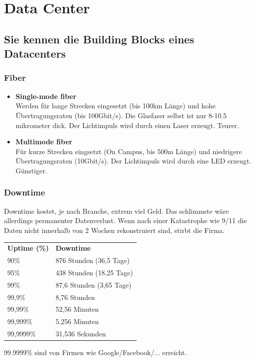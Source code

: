 \chapter{Data Center}
\section{Sie kennen die Building Blocks eines Datacenters}
\subsection{Fiber}
\begin{itemize}
	\item \textbf{Single-mode fiber}\\
		Werden für lange Strecken eingesetzt (bis 100km Länge) und hohe Übertragungsraten (bis 100Gbit/s). Die Glasfaser selbst ist nur 8-10.5 mikrometer dick. Der Lichtimpuls wird durch einen Laser erzeugt. Teurer.
	\item \textbf{Multimode fiber}\\
	Für kurze Strecken eingsetzt (On Campus, bis 500m Länge) und niedrigere Übertragungsraten (10Gbit/s). Der Lichtimpuls wird durch eine LED erzeugt. Günstiger.
\end{itemize}
\subsection{Downtime}
Downtime kostet, je nach Branche, extrem viel Geld. Das schlimmste wäre allerdings permanenter Datenverlust. Wenn nach einer Katastrophe wie 9/11 die Daten nicht innerhalb von 2 Wochen rekonstruiert sind, stirbt die Firma.
\begin{table}[h]
	\begin{tabular}{ll}
		\textbf{Uptime (\%)} & \textbf{Downtime}        \\
		90\%                 & 876 Stunden (36,5 Tage)  \\
		95\%                 & 438 Stunden (18,25 Tage) \\
		99\%                 & 87,6 Stunden (3,65 Tage) \\
		99,9\%               & 8,76 Stunden             \\
		99,99\%              & 52,56 Minuten            \\
		99,999\%             & 5,256 Minuten            \\
		99,9999\%            & 31,536 Sekunden         
		\end{tabular}
		\end{table}
		99.9999\% sind von Firmen wie Google/Facebook/... erreicht.
